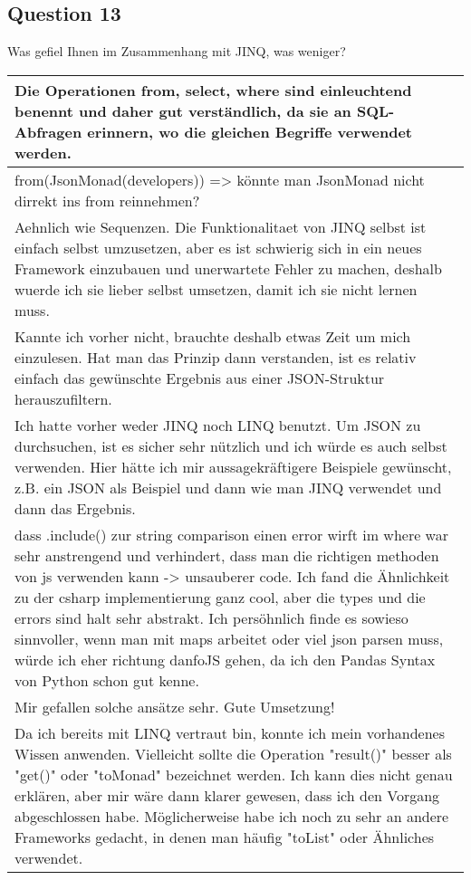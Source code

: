 \subsection*{Question 13}
\label{sub:ut_q13}
Was gefiel Ihnen im Zusammenhang mit JINQ, was weniger?
\begin{table}[H]
  \centering
  \begin{tabularx}{\textwidth}{| X |} \hline
    Die Operationen from, select, where sind einleuchtend benennt und daher gut verständlich, da sie an SQL-Abfragen erinnern, wo die gleichen Begriffe verwendet werden. \\ \hline 
    from(JsonMonad(developers)) => könnte man JsonMonad nicht dirrekt ins from reinnehmen? \\ \hline 
    Aehnlich wie Sequenzen. Die Funktionalitaet von JINQ selbst ist einfach selbst umzusetzen, aber es ist schwierig sich in ein neues Framework einzubauen und unerwartete Fehler zu machen, deshalb wuerde ich sie lieber selbst umsetzen, damit ich sie nicht lernen muss. \\ \hline 
    Kannte ich vorher nicht, brauchte deshalb etwas Zeit um mich einzulesen. Hat man das Prinzip dann verstanden, ist es relativ einfach das gewünschte Ergebnis aus einer JSON-Struktur herauszufiltern. \\ \hline 
    Ich hatte vorher weder JINQ noch LINQ benutzt. Um JSON zu durchsuchen, ist es sicher sehr nützlich und ich würde es auch selbst verwenden. Hier hätte ich mir aussagekräftigere Beispiele gewünscht, z.B. ein JSON als Beispiel und dann wie man JINQ verwendet und dann das Ergebnis. \\ \hline 
    dass .include() zur string comparison einen error wirft im where war sehr anstrengend und verhindert, dass man die richtigen methoden von js verwenden kann -> unsauberer code. Ich fand die Ähnlichkeit zu der csharp implementierung ganz cool, aber die types und die errors sind halt sehr abstrakt. Ich persöhnlich finde es sowieso sinnvoller, wenn man mit maps arbeitet oder viel json parsen muss, würde ich eher richtung danfoJS gehen, da ich den Pandas Syntax von Python schon gut kenne.\\ \hline 
    Mir gefallen solche ansätze sehr. Gute Umsetzung! \\ \hline 
    Da ich bereits mit LINQ vertraut bin, konnte ich mein vorhandenes Wissen anwenden. Vielleicht sollte die Operation "result()" besser als "get()" oder "toMonad" bezeichnet werden. Ich kann dies nicht genau erklären, aber mir wäre dann klarer gewesen, dass ich den Vorgang abgeschlossen habe. Möglicherweise habe ich noch zu sehr an andere Frameworks gedacht, in denen man häufig "toList" oder Ähnliches verwendet. \\ \hline 

\end{tabularx}
\end{table}
